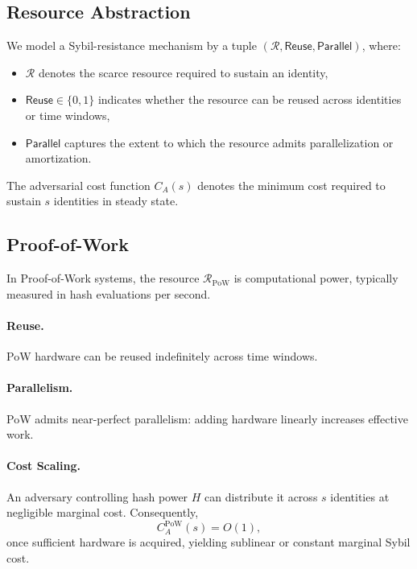\documentclass[sigconf,nonacm]{acmart}
\begin{document}
\subsection{Resource Abstraction}
\label{subsec:resource-abstraction}

We model a Sybil-resistance mechanism by a tuple
$(\mathcal{R}, \mathsf{Reuse}, \mathsf{Parallel})$, where:
\begin{itemize}
	\item $\mathcal{R}$ denotes the scarce resource required to sustain an identity,
	\item $\mathsf{Reuse} \in \{0,1\}$ indicates whether the resource can be reused
	across identities or time windows,
	\item $\mathsf{Parallel}$ captures the extent to which the resource admits
	parallelization or amortization.
\end{itemize}

The adversarial cost function $C_A(s)$ denotes the minimum cost required to
sustain $s$ identities in steady state.

\subsection{Proof-of-Work}
\label{subsec:pow}

In Proof-of-Work systems, the resource
$\mathcal{R}_{\mathrm{PoW}}$ is computational power, typically measured in hash
evaluations per second.

\paragraph{Reuse.}
PoW hardware can be reused indefinitely across time windows.

\paragraph{Parallelism.}
PoW admits near-perfect parallelism: adding hardware linearly increases effective
work.

\paragraph{Cost Scaling.}
An adversary controlling hash power $H$ can distribute it across $s$ identities
at negligible marginal cost. Consequently,
\[
C_A^{\mathrm{PoW}}(s) = O(1),
\]
once sufficient hardware is acquired, yielding sublinear or constant marginal
Sybil cost.
\end{document}
